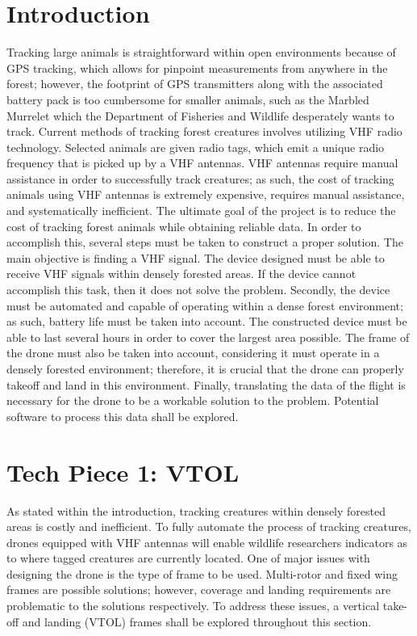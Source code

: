\documentclass[onecolumn, draftclsnofoot,10pt, compsoc]{IEEEtran}
\begin{document}
\section{Introduction}
Tracking large animals is straightforward within open environments because of GPS tracking, which allows for pinpoint measurements from anywhere in the forest; however, the footprint of GPS transmitters along with the associated battery pack is too cumbersome for smaller animals, such as the Marbled Murrelet which the Department of Fisheries and Wildlife desperately wants to track. Current methods of tracking forest creatures involves utilizing VHF radio technology. Selected animals are given radio tags, which emit a unique radio frequency that is picked up by a VHF antennas. VHF antennas require manual assistance in order to successfully track creatures; as such, the cost of tracking animals using VHF antennas is extremely expensive, requires manual assistance, and systematically inefficient. The ultimate goal of the project is to reduce the cost of tracking forest animals while obtaining reliable data. In order to accomplish this, several steps must be taken to construct a proper solution. The main objective is finding a VHF signal. The device designed must be able to receive VHF signals within densely forested areas. If the device cannot accomplish this task, then it does not solve the problem. Secondly, the device must be automated and capable of operating within a dense forest environment; as such, battery life must be taken into account. The constructed device must be able to last several hours in order to cover the largest area possible. The frame of the drone must also be taken into account, considering it must operate in a densely forested environment; therefore, it is crucial that the drone can properly takeoff and land in this environment. Finally, translating the data of the flight is necessary for the drone to be a workable solution to the problem. Potential software to process this data shall be explored.

\section{Tech Piece 1: VTOL}
As stated within the introduction, tracking creatures within densely forested areas is costly and inefficient. To fully automate the process of tracking creatures, drones equipped with VHF antennas will enable wildlife researchers indicators as to where tagged creatures are currently located. One of major issues with designing the drone is the type of frame to be used. Multi-rotor and fixed wing frames are possible solutions; however, coverage and landing requirements are problematic to the solutions respectively. To address these issues, a vertical take-off and landing (VTOL) frames shall be explored throughout this section.
\end{document}
